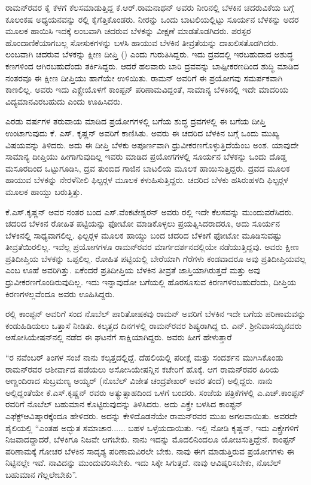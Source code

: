 ರಾಮನ್‍ರವರ ಕೈ ಕೆಳಗೆ ಕೆಲಸಮಾಡುತ್ತಿದ್ದ ಕೆ.ಆರ್.ರಾಮನಾಥನ್ ಅವರು ನೀರಿನಲ್ಲಿ ಬೆಳಕಿನ ಚದರುವಿಕೆಯ ಬಗ್ಗೆ ಕೂಲಂಕಷ ಅಧ್ಯಯನವನ್ನು ರಲ್ಲಿ ಕೈಗೆತ್ತಿಕೊಂಡರು. ನೀರನ್ನು ಒಂದು ಬಾಟಲಿಯಲ್ಲಿಟ್ಟು ಸೂರ್ಯನ ಬೆಳಕನ್ನು ಅದರ ಮೂಲಕ ಹಾಯಿಸಿ ಇದಕ್ಕೆ ಲಂಬವಾಗಿ ಚದರುವ ಬೆಳಕನ್ನು ವೀಕ್ಷಣೆ ಮಾಡತೊಡಗಿದರು. ಪರಸ್ಪರ ಹೊಂದಾಣಿಕೆಯಾಗಬಲ್ಲ ಸೋಸುಕಗಳನ್ನು ಬಳಸಿ ಹಾಯುವ ಬೆಳಕಿನ ತೀವ್ರತೆಯನ್ನು ದಾಖಲಿಸತೊಡಗಿದರು. ಲಂಬವಾಗಿ ಚದರುವ ಬೆಳಕನ್ನು ಕ್ಷೀಣ ದೀಪ್ತಿ () ಎಂದು ಗುರುತಿಸಿದ್ದರು. ಇದು ದ್ರವದಲ್ಲಿ ಇರಬಹುದಾದ ಅಶುದ್ಧ ಕಣಗಳಿಂದ ಆಗಿರಬಹುದೆಂದು ತರ್ಕಿಸಿದ್ದರು. ಆದರೆ ಹಲವಾರು ಬಾರಿ ದ್ರವವನ್ನು ಬಾಷ್ಪೀಕರಣದಿಂದ ಶುದ್ಧಿ ಮಾಡಿದ ನಂತರವೂ ಈ ಕ್ಷೀಣ ದೀಪ್ತಿಯು ಹಾಗೆಯೇ ಉಳಿಯಿತು. ರಾಮನ್ ಅವರಿಗೆ ಈ ಪ್ರಯೋಗವು ಸಮರ್ಪಕವಾಗಿ ಕಾಣಲಿಲ್ಲ. ಅವರು ಇದು ಎಕ್ಸ್\enginline{-}ರೇಯೊಳಗೆ ಕಾಂಪ್ಟನ್ ಪರಿಣಾಮವಿದ್ದಂತೆ, ಸಾಮಾನ್ಯ ಬೆಳಕಿನಲ್ಲಿ ಇದೇ ಮಾದರಿಯ ವಿದ್ಯಮಾನವಿರಬಹುದು ಎಂದು ಊಹಿಸಿದರು.

ಎರಡು ವರ್ಷಗಳ ತರುವಾಯ ಮಾಡಿದ ಪ್ರಯೋಗಗಳಲ್ಲಿ  ಬಗೆಯ ಶುದ್ಧ ದ್ರವಗಳಲ್ಲಿ ಈ ಬಗೆಯ ದೀಪ್ತಿ ಉಂಟಾಗುವುದು ಕೆ. ಎಸ್. ಕೃಷ್ಣನ್ ಅವರಿಗೆ ಕಾಣಿಸಿತು. ಅವರು ಈ ಚದರಿದ ಬೆಳಕಿನ ಬಗ್ಗೆ ಒಂದು ಮುಖ್ಯ ವಿಷಯವನ್ನು ತಿಳಿದರು. ಅದು ಈ ದೀಪ್ತಿ ಬೆಳಕು ಅಪೂರ್ಣವಾಗಿ ಧ್ರುವೀಕರಣಗೊಳ್ಳುತ್ತಿದೆಯೆಂಬ ಅಂಶ. ಯಾವುದೇ ಸಾಮಾನ್ಯ ದೀಪ್ತಿಯು ಹೀಗಾಗುವುದಿಲ್ಲ ಇವರು ಮಾಡಿದ ಪ್ರಯೋಗಗಳಲ್ಲಿ ಸೂರ್ಯನ ಬೆಳಕನ್ನು ಒಂದು ದೊಡ್ಡ ಮಸೂರದಿಂದ ಒಟ್ಟುಗೂಡಿಸಿ, ದ್ರವ ತುಂಬಿದ ಗಾಜಿನ ಬಾಟಲಿಯ ಮೂಲಕ ಹಾಯಿಸುತ್ತಿದ್ದರು. ದ್ರವದ ಮೂಲಕ ಹಾಯುವ ಬೆಳಕನ್ನು ನೇರಳೆ\enginline{-}ನೀಲಿ ಫಿಲ್ಟರ್‍ಗಳ ಮೂಲಕ ಕಳುಹಿಸುತ್ತಿದ್ದರು. ಚದರಿದ ಬೆಳಕು ಹಸಿರು\enginline{-}ಹಳದಿ ಫಿಲ್ಟರ್‍ಗಳ ಮೂಲಕ ಹಾಯ್ದು ಬರುತ್ತಿತ್ತು.

ಕೆ.ಎಸ್.ಕೃಷ್ಣನ್ ಅವರ ನಂತರ ಬಂದ ಎಸ್.ವೆಂಕಟೇಶ್ವರನ್ ಅವರು ರಲ್ಲಿ ಇದೇ ಕೆಲಸವನ್ನು ಮುಂದುವರೆಸಿದರು. ಚದರಿದ ಬೆಳಕಿನ ರೋಹಿತ ಪಟ್ಟಿಯನ್ನು ಫೋಟೋ ಮಾಡಿಕೊಳ್ಳಲು ಪ್ರಯತ್ನಿಸಿದರಾದರೂ, ಅದು ಸೂರ್ಯನ ಬೆಳಕಿನಲ್ಲಿ ಸಾಧ್ಯವಾಗಲಿಲ್ಲ. ಫಿಲ್ಟರ್‍ಗಳ ಮೂಲಕ ಹಾಯ್ದು ಬಂದ ಚದರಿದ ಬೆಳಕಿಗೆ ಫೋಟೋ ಮೂಡಿಸುವಷ್ಟು ತೀವ್ರತೆಯಿರಲಿಲ್ಲ. ಇವೆಲ್ಲ ಪ್ರಯೋಗಗಳೂ ರಾಮನ್‍ರವರ ಮಾರ್ಗದರ್ಶನದಲ್ಲಿಯೇ ನಡೆಯುತ್ತಿದ್ದವು. ಅವರು ಕ್ಷೀಣ ಪ್ರತಿದೀಪ್ತಿಯ ಬೆಳಕನ್ನು ಒಪ್ಪಲಿಲ್ಲ. ರೋಹಿತ ಪಟ್ಟಿಯಲ್ಲಿ ಬೇರೆಯಾಗಿ ಗೆರೆಗಳು ಕಂಡವಾದರೂ ಅವು ಪ್ರತಿದೀಪ್ತಿಯವಲ್ಲ ಎಂಬ ಊಹೆ ಅವರಿಗಿತ್ತು. ಏಕೆಂದರೆ ಪ್ರತಿದೀಪ್ತಿಯ ಬೆಳಕಿನ ತೀವ್ರತೆ ಜಾಸ್ತಿಯಾಗಿರುತ್ತದೆ ಮತ್ತು ಅವು ಧ್ರುವೀಕರಣಗೊಂಡಿರುವುದಿಲ್ಲ. ಇದು ಇನ್ನಾವುದೋ ಬಗೆಯಲ್ಲಿ ಹೊರಸೂಸುವ ಕಿರಣಗಳಿರಬಹುದೆಂದು, ದೀಪ್ತಿಯ ಕಿರಣಗಳಲ್ಲವೆಂದೂ ಅವರು ಊಹಿಸಿದ್ದರು.

ರಲ್ಲಿ ಕಾಂಪ್ಟನ್ ಅವರಿಗೆ ಸಂದ ನೊಬೆಲ್ ಪಾರಿತೋಷಕವು ರಾಮನ್ ಅವರಿಗೆ ಬೆಳಕಿನ ಇದೇ ಬಗೆಯ ಪರಿಣಾಮವನ್ನು ಕಂಡುಹಿಡಿಯಲು ಒತ್ತಾಸೆ ನೀಡಿತು. ಕಲ್ಕತ್ತದ ದಿನಗಳಲ್ಲಿ ರಾಮನ್‍ರವರ ಶಿಷ್ಯರಾಗಿದ್ದ ಬಿ. ಎನ್. ಶ‍್ರೀನಿವಾಸಯ್ಯನವರು ಅಸೋಸಿಯೇಷನ್‍ನಲ್ಲಿ ನಡೆದ ಈ ಘಟನೆಗೆ ಸಾಕ್ಷಿಯಾಗಿದ್ದರು. ಅವರು ಹೀಗೆ ಹೇಳುತ್ತಾರೆ\enginline{-}

“ರ ನವೆಂಬರ್ ತಿಂಗಳ ಸಂಜೆ ನಾನು ಕಲ್ಕತ್ತದಲ್ಲಿದ್ದೆ. ದೆಹಲಿಯಲ್ಲಿ ಪರೀಕ್ಷೆ ಮತ್ತು ಸಂದರ್ಶನ ಮುಗಿಸಿಕೊಂಡು ರಾಮನ್‍ರವರ ಆಶೀರ್ವಾದ ಪಡೆಯಲು ಅಸೋಸಿಯೇಷನ್ನಿನ ಕಚೇರಿಗೆ ಹೊಕ್ಕೆ. ಆಗ ರಾಮನ್‍ರವರ ಹಿರಿಯ ಅಣ್ಣಂದಿರಾದ ಸುಬ್ರಮಣ್ಯ ಅಯ್ಯರ್ (ನೊಬೆಲ್ ವಿಜೇತ ಚಂದ್ರಶೇಖರ್ ಅವರ ತಂದೆ) ಅಲ್ಲಿದ್ದರು. ನಾನು ಅಲ್ಲಿದ್ದಂತೆಯೇ ಕೆ.ಎಸ್.ಕೃಷ್ಣನ್ ರವರು ಅತ್ಯುತ್ಸಾಹದಿಂದ ಒಳಗೆ ಬಂದರು. ಸಂಜೆಯ ಪತ್ರಿಕೆಗಳಲ್ಲಿ ಎ.ಎಚ್.ಕಾಂಪ್ಟನ್ ರವರಿಗೆ ನೊಬೆಲ್ ಬಹುಮಾನ ಕೊಟ್ಟಿರುವುದನ್ನು ತಿಳಿಸಿದರು. ಅದು ಎಕ್ಸ್\enginline{-}ರೇ ಬಳಸಿದ ಕಾಂಪ್ಟನ್ ಎಫೆಕ್ಟ್\break ಆವಿಷ್ಕಾರಕ್ಕೆಂದೂ ಹೇಳಿದರು. ಅದನ್ನು ಕೇಳಿದೊಡನೆಯೇ ರಾಮನ್‍ರವರ ಮುಖ ಅಗಲವಾಯಿತು. ಅವರದೇ ಶೈಲಿಯಲ್ಲಿ “ಎಂತಹ ಅದ್ಭುತ ಸಮಾಚಾರ...... ಬಹಳ ಒಳ್ಳೆಯದಾಯಿತು. ಇಲ್ಲಿ ನೋಡಿ ಕೃಷ್ಣನ್, ಇದು ಎಕ್ಸ್\enginline{-}ರೇಗಳಿಗೆ ನಿಜವಾದದ್ದಾದರೆ, ಬೆಳಕಿಗೂ ನಿಜವೇ ಆಗಬೇಕು. ನಾನು ಇದನ್ನು ಮೊದಲಿನಿಂದಲೂ ಯೋಚಿಸುತ್ತಿದ್ದೇನೆ. ಕಾಂಪ್ಟನ್ ಪರಿಣಾಮಕ್ಕೆ ಗೋಚರ ಬೆಳಕಿನ ಸಾದೃಶ್ಯ ಪರಿಣಾಮವಿರಲೇ ಬೇಕು. ನಾವು ಈಗ ಮಾಡುತ್ತಿರುವ ಪ್ರಯೋಗಗಳು ಈ ನಿಟ್ಟಿನಲ್ಲೇ ಇವೆ. ನಾವಿದನ್ನು ಮುಂದುವರಿಸಬೇಕು. ಇದು ಸಿಕ್ಕೇ ಸಿಗುತ್ತದೆ. ನಾವು ಆವಿಷ್ಕರಿಸಬೇಕು, ನೊಬೆಲ್ ಬಹುಮಾನ ಗೆಲ್ಲಲೇಬೇಕು”.

